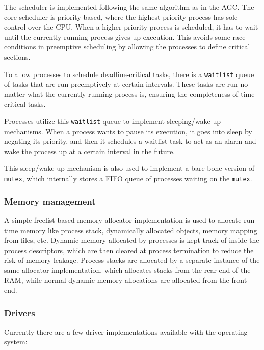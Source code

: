 \documentclass[oxford]{ahsan}
\begin{document}
The scheduler is implemented following the same algorithm as in the AGC. The core
scheduler is priority based, where the highest priority process has sole control over
the CPU. When a higher priority process is scheduled, it has to wait until the
currently running process gives up execution. This avoids some race conditions in
preemptive scheduling by allowing the processes to define critical sections.

To allow processes to schedule deadline-critical tasks, there is a \texttt{waitlist}
queue of tasks that are run preemptively at certain intervals. These tasks are run no
matter what the currently running process is, ensuring the completeness of
time-critical tasks.

Processes utilize this \texttt{waitlist} queue to implement sleeping/wake up
mechanisms. When a process wants to pause its execution, it goes into sleep by negating
its priority, and then it schedules a waitlist task to act as an alarm and wake the
process up at a certain interval in the future.

This sleep/wake up mechanism is also used to implement a bare-bone version of
\texttt{mutex}, which internally stores a FIFO queue of processes waiting on the
\texttt{mutex}.

\subsubsection*{Memory management}

A simple freelist-based memory allocator implementation is used to allocate run-time
memory like process stack, dynamically allocated objects, memory mapping from files,
etc. Dynamic memory allocated by processes is kept track of inside the process
descriptors, which are then cleared at process termination to reduce the risk of memory
leakage. Process stacks are allocated by a separate instance of the same allocator
implementation, which allocates stacks from the rear end of the RAM, while normal
dynamic memory allocations are allocated from the front end.

\subsubsection*{Drivers}

Currently there are a few driver implementations available with the operating system:
\end{document}
